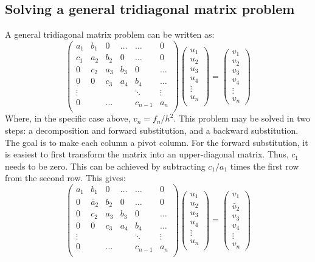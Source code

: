 \documentclass[a4paper, 10pt]{article}
\begin{document}
\subsection{Solving a general tridiagonal matrix problem}\label{general_algorithm_section}
A general tridiagonal matrix problem can be written as:
$$\begin{pmatrix}
a_{1} & b_1 & 0 & \ldots &  \ldots & 0\\
c_1 & a_2 & b_2  & 0 & \ldots & 0\\
0 & c_2 & a_3 &b_3 & 0 & \ldots \\
0 & 0 & c_3 & a_4 &b_4 &\ldots\\
\vdots &  & &  &\ddots & \vdots \\
0 && \ldots && c_{n-1}&  a_n  \\
\end{pmatrix}\begin{pmatrix}
u_1\\
u_2\\
u_3\\
u_4\\
\vdots\\
u_n\\
\end{pmatrix}=\begin{pmatrix}
v_1\\
v_2\\
v_3\\
v_4\\
\vdots\\
v_n
\end{pmatrix}$$
Where, in the specific case above, $v_n=f_n/h^2$. This problem may be solved in two steps: a decomposition and forward substitution, and a backward substitution. The goal is to make each column a pivot column. For the forward substitution, it is easiest to first transform the matrix into an upper-diagonal matrix. Thus, $c_1$ needs to be zero. This can be achieved by subtracting $c_1/a_1$ times the first row from the second row. This gives:
$$\begin{pmatrix}
a_{1} & b_1 & 0 & \ldots &  \ldots & 0\\
0 & \tilde{a_2} & b_2  & 0 & \ldots & 0\\
0 & c_2 & a_3 &b_3 & 0 & \ldots \\
0 & 0 & c_3 & a_4 &b_4 &\ldots\\
\vdots &  & &  &\ddots & \vdots \\
0 && \ldots && c_{n-1}&  a_n  \\
\end{pmatrix}\begin{pmatrix}
u_1\\
u_2\\
u_3\\
u_4\\
\vdots\\
u_n\\
\end{pmatrix}=\begin{pmatrix}
v_1\\
\tilde{v_2}\\
v_3\\
v_4\\
\vdots\\
v_n
\end{pmatrix}$$
\end{document}
